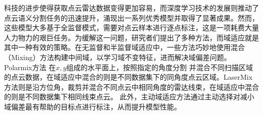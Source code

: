     科技的进步使得获取点云雷达数据变得更加容易，而深度学习技术的发展则推动了点云语义分割任务的迅速提升，涌现出一系列优秀模型并取得了显著成果。然而，这些模型大多基于全监督模式，需要对点云样本进行逐点标注，这是一项耗费大量人力物力的艰巨任务。为缓解这一问题，研究者们提出了多种方法，而域适应就是其中一种有效的策略。在无监督和半监督域适应中，一些方法巧妙地使用混合（Mixing）方法构建中间域，以学习域不变特征，进而解决域偏差问题。Polarmix方法
    在$x,y$组成的水平面上，按照指定的角度分割
    并混合不同扫描区域的点云数据，在域适应中混合的则是不同数据集下的同角度点云区域。LaserMix方法则是沿方位角，裁剪并混合不同点云中相同角度的雷达线束，在域适应中混合的则是不同数据集下相同线束点云。
    此外，主动域适应方法通过主动选择对减小域偏差最有帮助的目标点进行标注，从而提升模型性能。 

